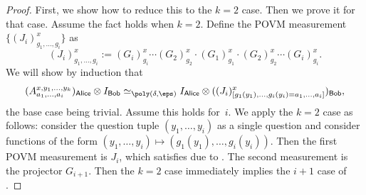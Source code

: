 \documentclass[11pt]{article}
\newcommand{\reg}[1]{{\mathsf{#1}}}
\begin{document}
\begin{proof}
First, we show how to reduce this to the $k = 2$ case. Then we prove it for that case.
Assume the fact holds when $k = 2$.  Define the POVM measurement $\{(J_i)^x_{g_1, \ldots, g_i}\}$ as
\begin{equation*}
(J_i)^x_{g_1, \ldots, g_i} := (G_i)^x_{g_i} \cdots (G_2)^x_{g_2} \cdot (G_1)^x_{g_1} \cdot (G_2)^x_{g_2} \cdots (G_i)^x_{g_i}.
\end{equation*}
We will show by induction that 
\begin{equation}\label{eq:hi-i-work-in-graphics-but-not-that-graphics}
(A^{x, y_1, \ldots, y_k}_{a_1, \ldots, a_i})_{\reg{Alice}} \otimes I_{\reg{Bob}}
	\simeq_{\poly(\delta, \eps)} I_{\reg{Alice}} \otimes ((J_i)^x_{[g_1(y_1), \ldots, g_i(y_i) = a_1, \ldots, a_i]})_{\reg{Bob}},
\end{equation}
the base case being trivial. Assume this holds for~$i$.
We apply the $k = 2$ case as follows:
consider the question tuple $(y_1, \ldots, y_i)$ as a single question
and consider functions of the form $(y_1, \ldots, y_i) \mapsto (g_1(y_1), \ldots, g_i(y_i))$.
Then the first POVM measurement is $J_i$, which satisfies  due to .
The second measurement is the projector $G_{i+1}$.
Then the $k = 2$ case immediately implies the $i+1$ case of .


\end{proof}
\end{document}
